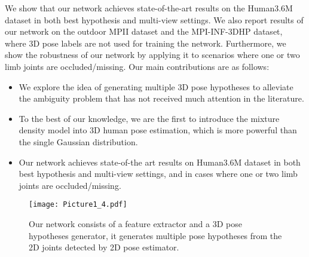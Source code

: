 \documentclass[10pt,twocolumn,letterpaper]{article}
\begin{document}
We show that our network achieves state-of-the-art results on the Human3.6M dataset \cite{ionescu2014human3} in both best hypothesis and multi-view settings. We also report results of our network on the outdoor MPII \cite{andriluka20142d} dataset and the MPI-INF-3DHP \cite{mehta2017monocular} dataset, where 3D pose labels are not used for training the network. Furthermore, we show the robustness of our network by applying it to scenarios where one or two limb joints are occluded/missing. Our main contributions are as follows: 

\begin{itemize}
    \item We explore the idea of generating multiple 3D pose hypotheses to alleviate the ambiguity problem that has not received much attention in the literature. 
    \item To the best of our knowledge, we are the first to introduce the mixture density model into 3D human pose estimation, which is more powerful than the single Gaussian distribution. 
    \item Our network achieves state-of-the art results on Human3.6M dataset in both best hypothesis and multi-view settings, and in cases where one or two limb joints are occluded/missing. 
\end{itemize}

\begin{figure*}
\begin{center}
\texttt{[image: Picture1\_4.pdf]}

\end{center}
\vspace{-6mm}
   \caption{Our network consists of a feature extractor and a 3D pose hypotheses generator, it generates multiple pose hypotheses from the 2D joints detected by 2D pose estimator.}
\label{fig:OurNetwork}
\vspace{-4mm}
\end{figure*}
\end{document}
